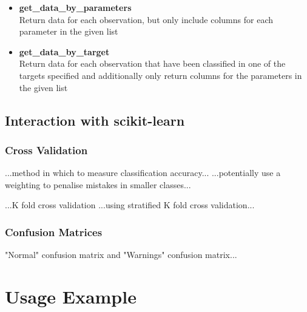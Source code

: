 \begin{itemize}
    \item \textbf{get\_data\_by\_parameters} \hfill\\
        Return data for each observation, but only include columns
        for each parameter in the given list
    \item \textbf{get\_data\_by\_target} \hfill\\
        Return data for each observation that have been classified in one of the
        targets specified and additionally only return columns for the
        parameters in the given list
\end{itemize}

\subsection{Interaction with scikit-learn}
\subsubsection{Cross Validation}

...method in which to measure classification accuracy...
...potentially use a weighting to penalise mistakes in smaller classes...

...K fold cross validation
...using stratified K fold cross validation...

\subsubsection{Confusion Matrices}
"Normal" confusion matrix and "Warnings" confusion matrix...

\section{Usage Example}

